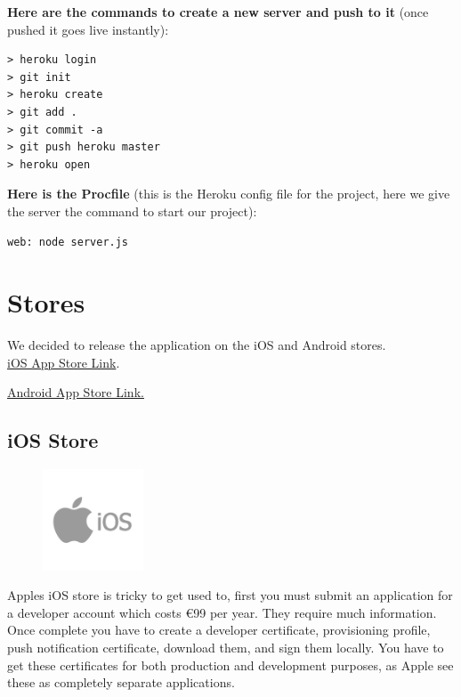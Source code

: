 \textbf{Here are the commands to create a new server and push to it} (once pushed it goes live instantly):
\begin{verbatim}
> heroku login
> git init
> heroku create
> git add .
> git commit -a
> git push heroku master
> heroku open
\end{verbatim}

\textbf{Here is the Procfile} (this is the Heroku config file for the project, here we give the server the command to start our project):
\begin{verbatim}
web: node server.js
\end{verbatim}

\section{Stores}
We decided to release the application on the iOS and Android stores.
\\

\href{https://itunes.apple.com/ie/app/gmit-catering/id1054850061?mt=8}{iOS App Store Link}.

\href{https://play.google.com/store/apps/details?id=ie.gmit.catering}{Android App Store Link.}

\subsection{iOS Store}
\begin{figure}
	\includegraphics[width=3cm]{img/mobile-app/logos/ios.png}
\end{figure} 
Apples iOS store \cite{ios} is tricky to get used to, first you must submit an application for a developer account which costs €99 per year. They require much information. Once complete you have to create a developer certificate, provisioning profile, push notification certificate, download them, and sign them locally. You have to get these certificates for both production and development purposes, as Apple see these as completely separate applications.
\\

